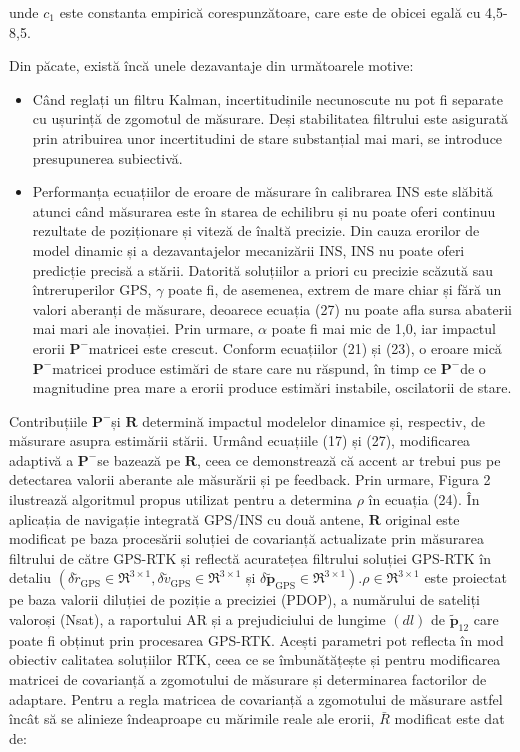 \documentclass[10pt]{report}
\begin{document}
unde $c_{1}$ este constanta empirică corespunzătoare, care este de obicei egală cu 4,5-8,5.

Din păcate, există încă unele dezavantaje din următoarele motive:

\begin{itemize}
  \item Când reglați un filtru Kalman, incertitudinile necunoscute nu pot fi separate cu ușurință de zgomotul de măsurare. Deși stabilitatea filtrului este asigurată prin atribuirea unor incertitudini de stare substanțial mai mari, se introduce presupunerea subiectivă.

  \item Performanța ecuațiilor de eroare de măsurare în calibrarea INS este slăbită atunci când măsurarea este în starea de echilibru și nu poate oferi continuu rezultate de poziționare și viteză de înaltă precizie. Din cauza erorilor de model dinamic și a dezavantajelor mecanizării INS, INS nu poate oferi predicție precisă a stării. Datorită soluțiilor a priori cu precizie scăzută sau întreruperilor GPS, $\gamma$ poate fi, de asemenea, extrem de mare chiar și fără un valori aberanți de măsurare, deoarece ecuația (27) nu poate afla sursa abaterii mai mari ale inovației. Prin urmare, $\alpha$ poate fi mai mic de 1,0, iar impactul erorii $\boldsymbol{P}^{-}$matricei este crescut. Conform ecuațiilor (21) și (23), o eroare mică $\boldsymbol{P}^{-}$matricei produce estimări de stare care nu răspund, în timp ce $\boldsymbol{P}^{-}$de o magnitudine prea mare a erorii produce estimări instabile, oscilatorii de stare.

\end{itemize}

Contribuțiile $\boldsymbol{P}^{-}$și $\boldsymbol{R}$ determină impactul modelelor dinamice și, respectiv, de măsurare asupra estimării stării. Urmând ecuațiile (17) și (27), modificarea adaptivă a $\boldsymbol{P}^{-}$se bazează pe $\boldsymbol{R}$, ceea ce demonstrează că accent ar trebui pus pe detectarea valorii aberante ale măsurării și pe feedback. Prin urmare, Figura 2 ilustrează algoritmul propus utilizat pentru a determina $\rho$ în ecuația (24). În aplicația de navigație integrată GPS/INS cu două antene, $\boldsymbol{R}$ original este modificat pe baza procesării soluției de covarianță actualizate prin măsurarea filtrului de către GPS-RTK și reflectă acuratețea filtrului soluției GPS-RTK în detaliu $\left(\delta \widetilde{r}_{\mathrm{GPS}} \in \Re^{3 \times 1}, \delta \widetilde{v}_{\mathrm{GPS}} \in \Re^{3 \times 1}\right.$ și $\left.\delta \widetilde{\boldsymbol{p}}_{\mathrm{GPS}} \in \Re^{3 \times 1}\right) . \rho \in \Re^{3 \times 1}$ este proiectat pe baza valorii diluției de poziție a preciziei (PDOP), a numărului de sateliți valoroși (Nsat), a raportului AR și a prejudiciului de lungime $(d l)$ de $\widetilde {\boldsymbol{p}}_{12}$ care poate fi obținut prin procesarea GPS-RTK. Acești parametri pot reflecta în mod obiectiv calitatea soluțiilor RTK, ceea ce se îmbunătățește și pentru modificarea matricei de covarianță a zgomotului de măsurare și determinarea factorilor de adaptare. Pentru a regla matricea de covarianță a zgomotului de măsurare astfel încât să se alinieze îndeaproape cu mărimile reale ale erorii, $\bar{R}$ modificat este dat de:
\end{document}
